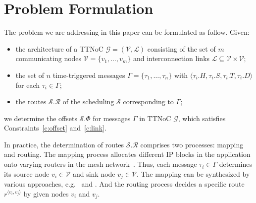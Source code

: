 \documentclass[journal]{IEEEtran}
\newcommand{\calG}{\mathcal{G}}
\newcommand{\calV}{\mathcal{V}}
\newcommand{\calL}{\mathcal{L}}
\newcommand{\calS}{\mathcal{S}}
\newcommand{\calR}{\mathcal{R}}
\newcommand{\route}[3]{#1^{\langle #2,#3\rangle}}
\theoremstyle{remark}
\begin{document}
\section{Problem Formulation\label{s:formulation}}
The problem we are addressing in this paper can be formulated as
follow. 
Given:
\begin{itemize}
\item the architecture of a TTNoC $\calG=(\calV,\calL)$ consisting of
  the set of $m$ communicating nodes $\calV=\{v_{1},\dots,v_{m}\}$ and
  interconnection links $\calL \subseteq \calV \times \calV$;
\item the set of $n$ time-triggered messages $\Gamma =
  \{\tau_{1},\dots,\tau_{n} \}$ with $\langle \tau_{i}.H,\tau_{i}.S,
  \tau_{i}.T, \tau_{i}.D\rangle$ for each $\tau_i \in \Gamma$;
\item the routes $\calS.\calR$ of the scheduling $\calS$ corresponding
  to $\Gamma$;
\end{itemize}
we determine the offsets $\calS.\Phi$ for messages $\Gamma$ in TTNoC $\calG$,
 which satisfies Constraints~\ref{c:offset} and~\ref{c:link}.

In practice, the determination of routes $\calS.\calR$ comprises two processes: mapping and routing. 
The mapping process allocates different IP blocks in the application onto varying routers in the mesh network~\cite{DBLP:journals/tjs/WangLY16}.
Thus, each message $\tau_i\in\Gamma$ determines its source node $v_i\in\calV$ and sink node $v_j\in\calV$. 
The mapping can be synthesized by various approaches, e.g.~\cite{DBLP:conf/recosoc/MesidisI11} and \cite{DBLP:journals/ieiceee/WangLYS16}.  
And the routing process decides a specific route $\route{r}{v_i}{v_j}$ by given nodes $v_i$ and $v_j$.

\end{document}
